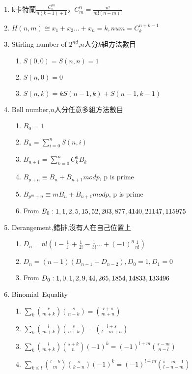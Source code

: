 \begin{enumerate}
\itemsep = -3pt
\item k卡特蘭$\frac{C_{n}^{kn}}{n(k-1)+1}$，$C_{m}^{n}=\frac{n!}{m!(n-m)!}$
\item $H(n,m)\cong x_1+x_2\ldots +x_n=k, num=C_{k}^{n+k-1}$
\item Stirling number of $2^{nd}$,$n$人分$k$組方法數目
	\begin{enumerate}\itemsep = -2pt
		\item $S(0,0)=S(n,n)=1$
		\item $S(n,0)=0$
		\item $S(n,k)=kS(n-1,k)+S(n-1,k-1)$
	\end{enumerate}
\item Bell number,$n$人分任意多組方法數目
	\begin{enumerate}\itemsep = -2pt
		\item $B_0=1$
		\item $B_n=\sum_{i=0}^nS(n,i)$
		\item $B_{n+1}=\sum_{k=0}^{n} C_k^n B_k$
		\item $B_{p+n}\equiv B{_n}+B_{n+1} mod p$, p is prime
		\item $B_{p^m+n}\equiv mB{_n}+B_{n+1} mod p$, p is prime
		\item From $B_0: 1,1,2,5,15,52,\\203,877,4140,21147,115975$
	\end{enumerate}
\item Derangement,錯排,沒有人在自己位置上
	\begin{enumerate}\itemsep = -2pt
		\item $D_n=n!(1-\frac{1}{1!}+\frac{1}{2!}-\frac{1}{3!}\ldots +(-1)^n\frac{1}{n!})$
		\item $D_n=(n-1)(D_{n-1}+D_{n-2}),D_0=1,D_1=0$
		\item From $D_0: 1,0,1,2,9,44,\\265,1854,14833,133496$
	\end{enumerate}
\item Binomial\ Equality
	\begin{enumerate}\itemsep = -2pt
	    \item $\sum_k \binom{r}{m + k} \binom{s}{n - k} = \binom{r + s}{m + n}$
         \item $\sum_k \binom{l}{m + k} \binom{s}{n + k} = \binom{l + s}{l -m + n}$		
         \item $\sum_k \binom{l}{m + k} \binom{s + k}{n}(-1)^k = (-1)^{l + m} \binom{s - m}{n - l}$
		\item $\sum_{k\leq l} \binom{l - k}{m} \binom{s}{k - n}(-1)^k = (-1)^{l + m} \binom{s - m - 1}{l - n - m}$

\end{enumerate}
\end{enumerate}
